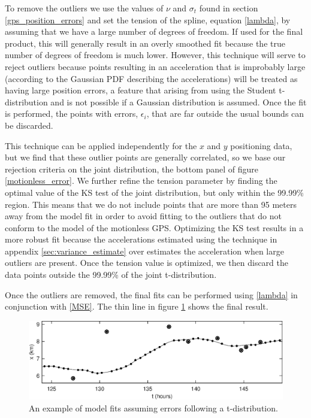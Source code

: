 \documentclass[10pt,journal]{IEEEtran}
\begin{document}
To remove the outliers we use the values of $\nu$ and $\sigma_t$ found in section \ref{gps_position_errors} and set the tension of the spline, equation \ref{lambda}, by assuming that we have a large number of degrees of freedom. If used for the final product, this will generally result in an overly smoothed fit because the true number of degrees of freedom is much lower. However, this technique will serve to reject outliers because points resulting in an acceleration that is improbably large (according to the Gaussian PDF describing the accelerations) will be treated as having large position errors, a feature that arising from using the Student t-distribution and is not possible if a Gaussian distribution is assumed. Once the fit is performed, the points with errors, $\epsilon_i$, that are far outside the usual bounds can be discarded. 

This technique can be applied independently for the $x$ and $y$ positioning data, but we find that these outlier points are generally correlated, so we base our rejection criteria on the joint distribution, the bottom panel of figure \ref{motionless_error}. We further refine the tension parameter by finding the optimal value of the KS test of the joint distribution, but only within the 99.99\% region. This means that we do not include points that are more than 95 meters away from the model fit in order to avoid fitting to the outliers that do not conform to the model of the motionless GPS. Optimizing the KS test results in a more robust fit because the accelerations estimated using the technique in appendix \ref{sec:variance_estimate} over estimates the acceleration when large outliers are present. Once the tension value is optimized, we then discard the data points outside the 99.99\% of the joint t-distribution.

Once the outliers are removed, the final fits can be performed using \ref{lambda} in conjunction with \ref{MSE}. The thin line in figure \ref{tdistributionfit} shows the final result.

\begin{figure}[t]
  \centerline{\includegraphics[width=39pc,angle=0]{tdistributionfit}}
  
  \caption{An example of model fits assuming errors following a t-distribution.}
  \label{tdistributionfit}
\end{figure}
\end{document}
